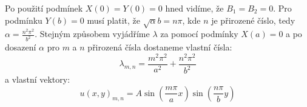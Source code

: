 \documentclass{article}
\begin{document}
Po použití podmínek $X(0)=Y(0)=0$ hned vidíme, že $B_1=B_2=0$. Pro podmínku $Y(b)=0$ musí platit, že $\sqrt{\alpha}b=n\pi$, kde $n$ je přirozené číslo, tedy $\alpha=\frac{n^2\pi^2}{b^2}$. Stejným způsobem vyjádříme $\lambda$ za pomocí podmínky $X(a)=0$ a po dosazení $\alpha$ pro $m$ a $n$ přirozená čísla dostaneme vlastní čísla:
\begin{equation}
\lambda_{m,n}=\frac{m^2\pi^2}{a^2}+\frac{n^2\pi^2}{b^2}
\end{equation}
a vlastní vektory:
\begin{equation}
u(x,y)_{m,n}=A\sin{(\frac{m\pi}{a}x)}\sin{(\frac{n\pi}{b}y)}
\end{equation}
\end{document}
